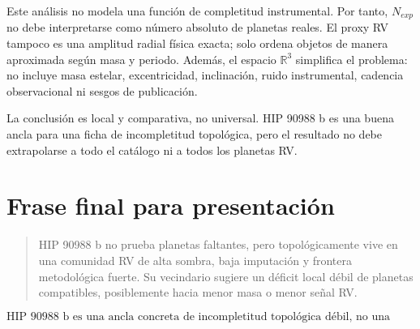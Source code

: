 \documentclass[11pt]{article}
\begin{document}
Este análisis no modela una función de completitud instrumental. Por tanto, $N_{exp}$ no debe interpretarse como número absoluto de planetas reales. El proxy RV tampoco es una amplitud radial física exacta; solo ordena objetos de manera aproximada según masa y periodo. Además, el espacio $\mathbb{R}^3$ simplifica el problema: no incluye masa estelar, excentricidad, inclinación, ruido instrumental, cadencia observacional ni sesgos de publicación.

La conclusión es local y comparativa, no universal. HIP 90988 b es una buena ancla para una ficha de incompletitud topológica, pero el resultado no debe extrapolarse a todo el catálogo ni a todos los planetas RV.

\section{Frase final para presentación}

\begin{quote}
HIP 90988 b no prueba planetas faltantes, pero topológicamente vive en una comunidad RV de alta sombra, baja imputación y frontera metodológica fuerte. Su vecindario sugiere un déficit local débil de planetas compatibles, posiblemente hacia menor masa o menor señal RV.
\end{quote}

\[
\boxed{
\text{HIP 90988 b es una ancla concreta de incompletitud topológica débil, no una detección de planetas ausentes.}
}
\]
\end{document}

